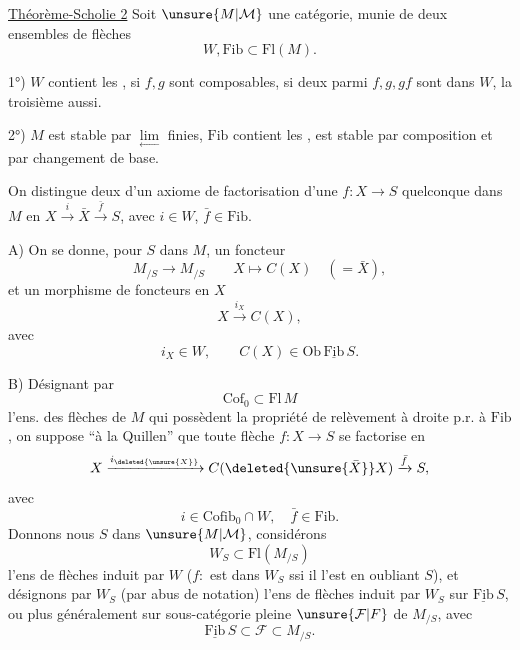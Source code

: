 \uline{Théorème-Scholie 2} Soit $\unsure{M|\mathcal M}$ une catégorie, munie de deux ensembles de flèches
\[
W,\mathrm{Fib}\subset\mathrm{Fl}(M).
\]

 1°) $W$ contient les ,  si $f,g$ sont composables, si deux parmi $f,g,gf$ sont dans $W$, la troisième aussi.

2°)  $M$ est stable par $\underset{\leftarrow}{\lim}$ finies, $\mathrm{Fib}$  contient les , est stable par composition et par changement de base.


On distingue deux   d'un axiome  de factorisation d'une $f:X\longrightarrow S$ quelconque dans $M$ en $X\xrightarrow{i}\bar X\xrightarrow{\bar f}S$, avec $i\in W$, $\bar f\in\mathrm{Fib}$.

A) On se donne, pour  $S$ dans $M$, un foncteur
\[
M_{/S}\longrightarrow M_{/S}\qquad X\longmapsto C(X)\quad(=\bar X),
\]
 et un morphisme de foncteurs en $X$
\[
X\xrightarrow{i_X}C(X),
\]
avec
\[
i_X\in W,\qquad C(X)\in\mathrm{Ob}\,\underline{\mathrm{Fib}}\,S.
\]

B) Désignant par
\[
\mathrm{Cof}_0\subset\mathrm{Fl}\,M
\]
l'ens. des flèches de $M$ qui possèdent la propriété de relèvement à droite p.r. à $\mathrm{Fib}$, on suppose ``à la Quillen'' que toute  flèche $f:X\longrightarrow S$ se factorise en
\[
X\xrightarrow{i_{\deleted{\unsure{X}}}}C(\deleted{\unsure{\bar X}}X)\xrightarrow{\bar f}S,
\]
avec
\[
i\in\mathrm{Cofib}_0\cap W,\quad \bar f\in\mathrm{Fib}.
\]
Donnons nous $S$ dans $\unsure{M|\mathcal M}$, considérons
\[
W_S\subset\mathrm{Fl}(M_{/S})
\]
l'ens de flèches induit par $W$ ($f:$
est dans $W_S$ ssi il l'est en oubliant $S$), et désignons par $W_S$ (par abus de notation) l'ens de flèches induit par $W_S$ sur $\underline{\mathrm{Fib}}\,S$, ou plus généralement sur  sous-catégorie pleine $\unsure{\mathcal F|F}$ de $M_{/S}$, avec
\[
\underline{\mathrm{Fib}}\,S\subset\mathcal F\subset M_{/S}.
\]

